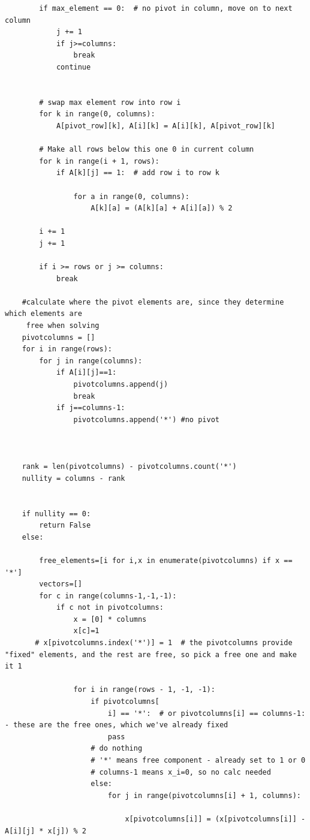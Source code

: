 \documentclass[10pt,a4paper]{report}
\begin{document}
\begin{verbatim}
        if max_element == 0:  # no pivot in column, move on to next column
            j += 1
            if j>=columns:
                break
            continue


        # swap max element row into row i
        for k in range(0, columns):
            A[pivot_row][k], A[i][k] = A[i][k], A[pivot_row][k]

        # Make all rows below this one 0 in current column
        for k in range(i + 1, rows):
            if A[k][j] == 1:  # add row i to row k

                for a in range(0, columns):
                    A[k][a] = (A[k][a] + A[i][a]) % 2

        i += 1
        j += 1

        if i >= rows or j >= columns:
            break

    #calculate where the pivot elements are, since they determine which elements are
     free when solving
    pivotcolumns = []
    for i in range(rows):
        for j in range(columns):
            if A[i][j]==1:
                pivotcolumns.append(j)
                break
            if j==columns-1:
                pivotcolumns.append('*') #no pivot



    rank = len(pivotcolumns) - pivotcolumns.count('*')
    nullity = columns - rank


    if nullity == 0:
        return False
    else:

        free_elements=[i for i,x in enumerate(pivotcolumns) if x == '*']
        vectors=[]
        for c in range(columns-1,-1,-1):
            if c not in pivotcolumns:
                x = [0] * columns
                x[c]=1
       # x[pivotcolumns.index('*')] = 1  # the pivotcolumns provide "fixed" elements, and the rest are free, so pick a free one and make it 1

                for i in range(rows - 1, -1, -1):
                    if pivotcolumns[
                        i] == '*':  # or pivotcolumns[i] == columns-1: - these are the free ones, which we've already fixed
                        pass
                    # do nothing
                    # '*' means free component - already set to 1 or 0
                    # columns-1 means x_i=0, so no calc needed
                    else:
                        for j in range(pivotcolumns[i] + 1, columns):

                            x[pivotcolumns[i]] = (x[pivotcolumns[i]] - A[i][j] * x[j]) % 2


\end{verbatim}
\end{document}
